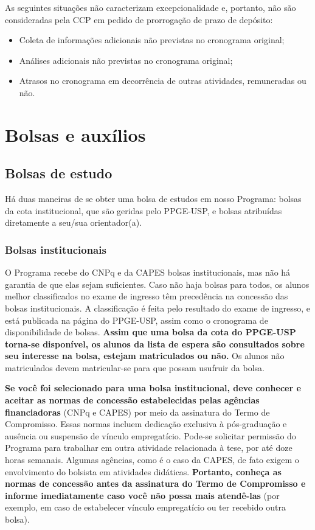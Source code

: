 As seguintes situações não caracterizam excepcionalidade e, portanto,
não são consideradas pela CCP em pedido de prorrogação de prazo de
depósito:

\begin{itemize}
\item Coleta de informações adicionais não previstas no cronograma
  original;
\item Análises adicionais não previstas no cronograma original;
\item Atrasos no cronograma em decorrência de outras atividades,
  remuneradas ou não.
\end{itemize}

\chapter{Bolsas e auxílios}

\section{Bolsas de estudo}
\label{sec:bolsas}

Há duas maneiras de se obter uma bolsa de estudos em nosso Programa:
bolsas da cota institucional, que são geridas pelo PPGE-USP, e bolsas
atribuídas diretamente a seu/sua orientador(a).

\subsection{Bolsas institucionais}

O Programa recebe do CNPq e da CAPES bolsas institucionais, mas não há
garantia de que elas sejam suficientes.
Caso não haja bolsas para todos, os alunos melhor classificados no
exame de ingresso têm precedência na concessão das bolsas
institucionais. A classificação é feita pelo resultado do exame de
ingresso, e está publicada na página do PPGE-USP, assim como o
cronograma de disponibilidade de bolsas. \textbf{Assim que uma bolsa
  da cota do PPGE-USP torna-se disponível, os alunos da lista de
  espera são consultados sobre seu interesse na bolsa, estejam
  matriculados ou não.}  Os alunos não matriculados devem
matricular-se para que possam usufruir da bolsa.

\textbf{Se você foi selecionado para uma bolsa institucional, deve
  conhecer e aceitar as normas de concessão estabelecidas pelas
  agências financiadoras} (CNPq e CAPES) por meio da assinatura do
Termo de Compromisso. Essas normas incluem dedicação exclusiva à
pós-graduação e ausência ou suspensão de vínculo empregatício. Pode-se
solicitar permissão do Programa para trabalhar em outra atividade
relacionada à tese, por até doze horas semanais. Algumas agências,
como é o caso da CAPES, de fato exigem o envolvimento do bolsista em
atividades didáticas. \textbf{Portanto, conheça as normas de concessão
  antes da assinatura do Termo de Compromisso e informe imediatamente
  caso você não possa mais atendê-las} (por exemplo, em caso de
estabelecer vínculo empregatício ou ter recebido outra bolsa).

